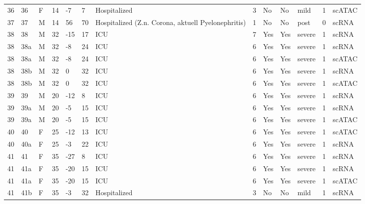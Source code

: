 \documentclass{book}
\begin{document}
\begin{refsection}
\begin{landscape}
\begin{longtable}{p{0.7cm}p{0.7cm}p{0.5cm}p{0.75cm}p{0.75cm}p{0.75cm}p{1.75cm}p{0.8cm}p{0.75cm}p{1cm}p{0.75cm}p{1cm}p{0.75cm}}
    36 & 36  & F & 14 & -7  & 7   & Hospitalized                                       & 3 & No  & No  & mild   & 1 & scATAC \\
    37 & 37  & M & 14 & 56  & 70  & Hospitalized (Z.n. Corona, aktuell Pyelonephritis) & 1 & No  & No  & post   & 0 & scRNA \\
    38 & 38  & M & 32 & -15 & 17  & ICU                                                & 7 & Yes & Yes & severe & 1 & scRNA \\
    38 & 38a & M & 32 & -8  & 24  & ICU                                                & 6 & Yes & Yes & severe & 1 & scRNA \\
    38 & 38a & M & 32 & -8  & 24  & ICU                                                & 6 & Yes & Yes & severe & 1 & scATAC \\
    38 & 38b & M & 32 & 0   & 32  & ICU                                                & 6 & Yes & Yes & severe & 1 & scRNA \\
    38 & 38b & M & 32 & 0   & 32  & ICU                                                & 6 & Yes & Yes & severe & 1 & scATAC \\
    39 & 39  & M & 20 & -12 & 8   & ICU                                                & 6 & Yes & Yes & severe & 1 & scRNA \\
    39 & 39a & M & 20 & -5  & 15  & ICU                                                & 6 & Yes & Yes & severe & 1 & scRNA \\
    39 & 39a & M & 20 & -5  & 15  & ICU                                                & 6 & Yes & Yes & severe & 1 & scATAC \\
    40 & 40  & F & 25 & -12 & 13  & ICU                                                & 6 & Yes & Yes & severe & 1 & scATAC \\
    40 & 40a & F & 25 & -3  & 22  & ICU                                                & 6 & Yes & Yes & severe & 1 & scRNA \\
    41 & 41  & F & 35 & -27 & 8   & ICU                                                & 6 & Yes & Yes & severe & 1 & scRNA \\
    41 & 41a & F & 35 & -20 & 15  & ICU                                                & 6 & Yes & Yes & severe & 1 & scRNA \\
    41 & 41a & F & 35 & -20 & 15  & ICU                                                & 6 & Yes & Yes & severe & 1 & scATAC \\
    41 & 41b & F & 35 & -3  & 32  & Hospitalized                                       & 3 & No  & No  & mild   & 1 & scRNA \\

\end{longtable}
\end{landscape}
\end{refsection}
\end{document}
